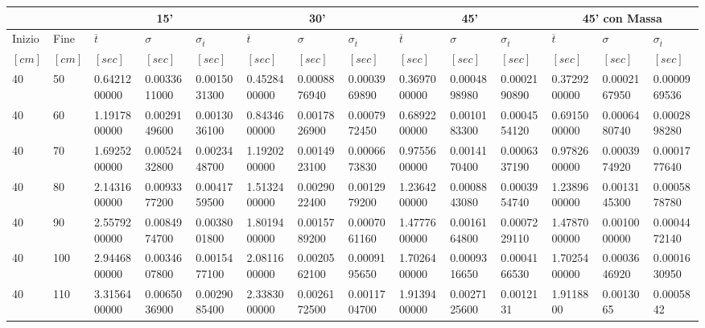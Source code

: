 \documentclass[a4paper,11pt,oneside]{article}
\begin{document}
\begin{table}[]
\begin{tabular}{ll|lll|lll|lll|lll}
\toprule
\multicolumn{2}{l|}{}      & \multicolumn{3}{c|}{\textbf{15'}}                      & \multicolumn{3}{c|}{\textbf{30'}}                      & \multicolumn{3}{c}{\textbf{45'}}                       & \multicolumn{3}{c|}{\textbf{45' con Massa}}            \\ \midrule
Inizio      & Fine        & $\overline{t}$ & $\sigma$     & $\sigma_{\overline{t}}$ & $\overline{t}$ & $\sigma$     & $\sigma_{\overline{t}}$ & $\overline{t}$ & $\sigma$     & $\sigma_{\overline{t}}$ & $\overline{t}$ & $\sigma$     & $\sigma_{\overline{t}}$ \\
$[\si{cm}]$ & $[\si{cm}]$ & $[\si{sec}]$   & $[\si{sec}]$ & $[\si{sec}]$           & $[\si{sec}]$   & $[\si{sec}]$ & $[\si{sec}]$           & $[\si{sec}]$   & $[\si{sec}]$ & $[\si{sec}]$           & $[\si{sec}]$   & $[\si{sec}]$ & $[\si{sec}]$           \\ \midrule
40          & 50          & 0.6421200000   & 0.0033611000 & 0.0015031300           & 0.4528400000   & 0.0008876940 & 0.0003969890           & 0.3697000000   & 0.0004898980 & 0.0002190890           & 0.3729200000   & 0.0002167950 & 0.0000969536           \\
40          & 60          & 1.1917800000   & 0.0029149600 & 0.0013036100           & 0.8434600000   & 0.0017826900 & 0.0007972450           & 0.6892200000   & 0.0010183300 & 0.0004554120           & 0.6915000000   & 0.0006480740 & 0.0002898280           \\
40          & 70          & 1.6925200000   & 0.0052432800 & 0.0023448700           & 1.1920200000   & 0.0014923100 & 0.0006673830           & 0.9755600000   & 0.0014170400 & 0.0006337190           & 0.9782600000   & 0.0003974920 & 0.0001777640           \\
40          & 80          & 2.1431600000   & 0.0093377200 & 0.0041759500           & 1.5132400000   & 0.0029022400 & 0.0012979200           & 1.2364200000   & 0.0008843080 & 0.0003954740           & 1.2389600000   & 0.0013145300 & 0.0005878780           \\
40          & 90          & 2.5579200000   & 0.0084974700 & 0.0038001800           & 1.8019400000   & 0.0015789200 & 0.0007061160           & 1.4777600000   & 0.0016164800 & 0.0007229110           & 1.4787000000   & 0.0010000000 & 0.0004472140           \\
40          & 100         & 2.9446800000   & 0.0034607800 & 0.0015477100           & 2.0811600000   & 0.0020562100 & 0.0009195650           & 1.7026400000   & 0.0009316650 & 0.0004166530           & 1.7025400000   & 0.0003646920 & 0.0001630950           \\
40          & 110         & 3.3156400000   & 0.0065036900 & 0.0029085400           & 2.3383000000   & 0.0026172500 & 0.0011704700           & 1.9139400000   & 0.0027125600 & 0.0012131           & 1.9118800   & 0.0013065 & 0.0005842 \\
\bottomrule
\end{tabular}
\end{table}
\end{document}
